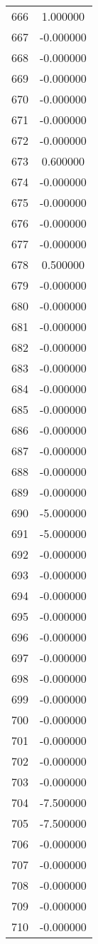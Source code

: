 \documentclass[12pt]{article}
\begin{document}
\begin{longtable}{@{}cc@{}}
666 & 1.000000 \\
667 & -0.000000 \\
668 & -0.000000 \\
669 & -0.000000 \\
670 & -0.000000 \\
671 & -0.000000 \\
672 & -0.000000 \\
673 & 0.600000 \\
674 & -0.000000 \\
675 & -0.000000 \\
676 & -0.000000 \\
677 & -0.000000 \\
678 & 0.500000 \\
679 & -0.000000 \\
680 & -0.000000 \\
681 & -0.000000 \\
682 & -0.000000 \\
683 & -0.000000 \\
684 & -0.000000 \\
685 & -0.000000 \\
686 & -0.000000 \\
687 & -0.000000 \\
688 & -0.000000 \\
689 & -0.000000 \\
690 & -5.000000 \\
691 & -5.000000 \\
692 & -0.000000 \\
693 & -0.000000 \\
694 & -0.000000 \\
695 & -0.000000 \\
696 & -0.000000 \\
697 & -0.000000 \\
698 & -0.000000 \\
699 & -0.000000 \\
700 & -0.000000 \\
701 & -0.000000 \\
702 & -0.000000 \\
703 & -0.000000 \\
704 & -7.500000 \\
705 & -7.500000 \\
706 & -0.000000 \\
707 & -0.000000 \\
708 & -0.000000 \\
709 & -0.000000 \\
710 & -0.000000 \\

\end{longtable}
\end{document}
